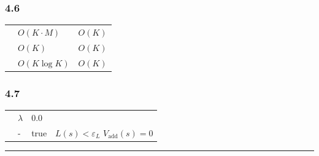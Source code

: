 \documentclass[
  12pt,
]{article}
\begin{document}
\subsubsection{4.6 }\label{ux8ba1ux7b97ux590dux6742ux5ea6-3}

\begin{longtable}[]{@{}lll@{}}
\toprule\noalign{}
 &  &  \\
\midrule\noalign{}
\endhead
\bottomrule\noalign{}
\endlastfoot
 & \(O(K \cdot M)\) & \(O(K)\) \\
 & \(O(K)\) & \(O(K)\) \\
 & \(O(K \log K)\) & \(O(K)\) \\
\end{longtable}

\subsubsection{4.7 }\label{ux5173ux952eux8d85ux53c2ux6570-3}

\begin{longtable}[]{@{}
  >{\raggedright\arraybackslash}p{}
  >{\raggedright\arraybackslash}p{}
  >{\raggedright\arraybackslash}p{}
  >{\raggedright\arraybackslash}p{}@{}}
\toprule\noalign{}
\begin{minipage}[b]{\linewidth}\raggedright

\end{minipage} & \begin{minipage}[b]{\linewidth}\raggedright

\end{minipage} & \begin{minipage}[b]{\linewidth}\raggedright

\end{minipage} & \begin{minipage}[b]{\linewidth}\raggedright

\end{minipage} \\
\midrule\noalign{}
\endhead
\bottomrule\noalign{}
\endlastfoot
 & \(\lambda\) & \(0.0\) &  \\
 & - & true &  \(L(s) < \varepsilon_L\)
\(V_{\text{add}}(s)=0\) \\
\end{longtable}

\begin{center}\rule{0.5\linewidth}{0.5pt}\end{center}
\end{document}
